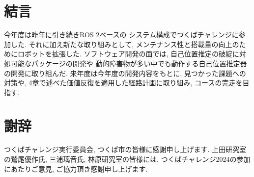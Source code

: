 \documentclass[twocolumn,9pt]{jsproceedings}
\begin{document}
\section{結言}
今年度は昨年に引き続きROS 2ベースの
システム構成でつくばチャレンジに参加した. 
それに加え新たな取り組みとして, 
メンテナンス性と搭載量の向上のためにロボットを拡張した. 
ソフトウェア開発の面では, 自己位置推定の破綻に対処可能なパッケージの開発や
動的障害物が多い中でも動作する自己位置推定器の開発に取り組んだ. 
来年度は今年度の開発内容をもとに, 見つかった課題への対策や, 
4章で述べた価値反復を適用した経路計画に取り組み, 
コースの完走を目指す. 


\section*{謝辞}
つくばチャレンジ実行委員会, つくば市の皆様に感謝申し上げます. 
上田研究室の鷲尾優作氏, 三浦璃音氏, 
林原研究室の皆様には, つくばチャレンジ2024の参加にあたりご意見, ご協力頂き感謝申し上げます. 
\end{document}
